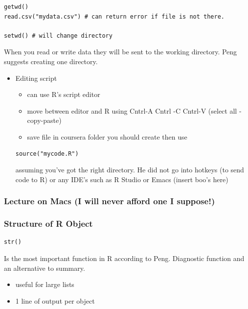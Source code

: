 \documentclass[11pt]{article}
\begin{document}
\begin{verbatim}
getwd()
read.csv("mydata.csv") # can return error if file is not there.

setwd() # will change directory
\end{verbatim}

When you read or write data they will be sent to the working
directory. Peng suggests creating one directory.
\begin{itemize}

\item Editing script
\label{sec-1-7-7-1}%
\begin{itemize}
\item can use R's script editor
\item move between editor and R using Cntrl-A Cntrl -C Cntrl-V
  (select all - copy-paste)
\item save file in coursera folder you should create then use
\end{itemize}

\begin{verbatim}
source("mycode.R")
\end{verbatim}

assuming you've got the right directory. He did not go into hotkeys
(to send code to R) or any IDE's such as R Studio or Emacs (insert
boo's here)

\end{itemize} %
\subsubsection{Lecture on Macs (I will never afford one I suppose!)}
\label{sec-1-7-8}
\subsubsection{Structure of R Object}
\label{sec-1-7-9}


\begin{verbatim}
str()
\end{verbatim}

Is the most important function in R according to Peng. Diagnostic
function and an alternative to summary.

\begin{itemize}
\item useful for large lists
\item 1 line of output per object
\end{itemize}
\end{document}
